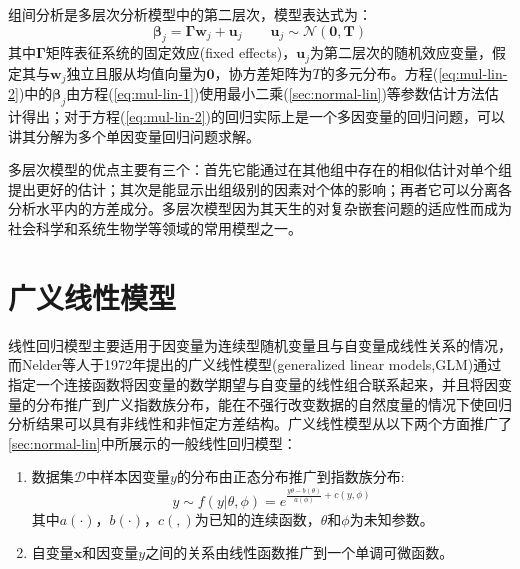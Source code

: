 \documentclass[a4paper]{ctexart}
\begin{document}
\begin{spacing}{1.3}
	组间分析是多层次分析模型中的第二层次，模型表达式为\cite{RN83}：
	\begin{equation}\label{eq:mul-lin-2}
	\bm\beta_{j}=\bm\Gamma\bm w_{j}+\bm u_j
	\qquad \bm u_j\sim\mathcal{N}(\bm 0,\bm T)
	\end{equation}
	其中$\bm\Gamma$矩阵表征系统的固定效应(fixed effects)，$\bm u_j$为第二层次的随机效应变量，假定其与$\bm w_{j}$独立且服从均值向量为$\bm 0$，协方差矩阵为$T$的多元分布\cite{RN83}。方程(\ref{eq:mul-lin-2})中的$\bm\beta_{j}$由方程(\ref{eq:mul-lin-1})使用最小二乘(\ref{sec:normal-lin})等参数估计方法估计得出\cite{RN76}；对于方程(\ref{eq:mul-lin-2})的回归实际上是一个多因变量的回归问题，可以讲其分解为多个单因变量回归问题求解。
	
	多层次模型的优点主要有三个：首先它能通过在其他组中存在的相似估计对单个组提出更好的估计；其次是能显示出组级别的因素对个体的影响；再者它可以分离各分析水平内的方差成分\cite{RN75}。多层次模型因为其天生的对复杂嵌套问题的适应性而成为社会科学和系统生物学等领域的常用模型之一。
	
	\section{广义线性模型}
	线性回归模型主要适用于因变量为连续型随机变量且与自变量成线性关系的情况，而Nelder等人于1972年\cite{RN91}提出的广义线性模型(generalized linear models,GLM)通过指定一个连接函数将因变量的数学期望与自变量的线性组合联系起来，并且将因变量的分布推广到广义指数族分布，能在不强行改变数据的自然度量的情况下使回归分析结果可以具有非线性和非恒定方差结构\cite{RN92}。广义线性模型从以下两个方面推广了\ref{sec:normal-lin}中所展示的一般线性回归模型：
	\begin{enumerate}[itemindent=2em,label=(\arabic*)]
		\item 数据集$\mathcal{D}$中样本因变量$y$的分布由正态分布推广到指数族分布:
		\begin{equation}
		y\sim f(y|\theta,\phi)=e^{\frac{y\theta-b(\theta)}{a(\phi)}+c(y,\phi)}
		\end{equation}
		其中$a(\cdot)$，$b(\cdot)$，$c(,)$为已知的连续函数，$\theta$和$\phi$为未知参数。
		\item 自变量$\bm x$和因变量$y$之间的关系由线性函数推广到一个单调可微函数。
	\end{enumerate}


\end{spacing}
\end{document}
